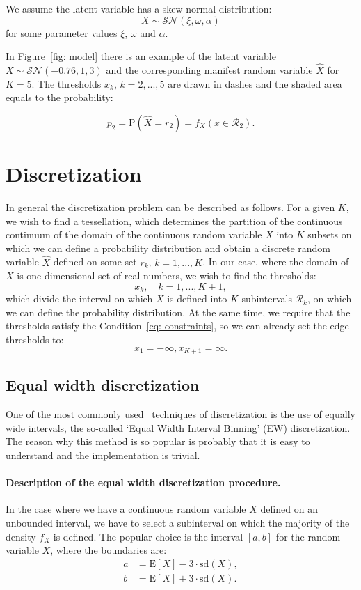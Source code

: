 \documentclass[10pt]{article}
\begin{document}
We assume the latent variable has a skew-normal distribution:
\begin{equation}
X \sim \mathcal{SN}(\xi, \omega, \alpha)
\end{equation}
for some parameter values $\xi$, $\omega$ and $\alpha$.

In Figure~\ref{fig: model} there is an example of the latent variable $X \sim \mathcal{SN}(-0.76, 1, 3)$ and the corresponding manifest random variable $\hat{X}$ for $K = 5$. The thresholds $x_{k}$, $k = 2, ..., 5$ are drawn in dashes and the shaded area equals to the probability:

$$
p_{2} = \mathrm{P}(\hat{X} = r_{2}) = f_{X}(x \in \mathcal{R}_{2}).
$$

\section{Discretization} \label{sec: discretization}
In general the discretization problem can be described as follows. For a given $K$, we wish to find a tessellation, which determines the partition of the continuous continuum of the domain of the continuous random variable $X$ into $K$ subsets on which we can define a probability distribution and obtain a discrete random variable $\hat{X}$ defined on some set $r_{k}$, $k = 1, ..., K$. In our case, where the domain of $X$ is one-dimensional set of real numbers, we wish to find the thresholds:
$$
x_{k}, \quad k = 1, ..., K + 1,
$$
which divide the interval on which $X$ is defined into $K$ subintervals $\mathcal{R}_{k}$, on which we can define the probability distribution. At the same time, we require that the thresholds satisfy the Condition~\ref{eq: constraints}, so we can already set the edge thresholds to:
$$
x_{1} = -\infty, x_{K + 1} = \infty.
$$

\subsection{Equal width discretization} \label{sec: EW}
One of the most commonly used~\cite{Wu} techniques of discretization is the use of equally wide intervals, the so-called ‘Equal Width Interval Binning’ (EW) discretization. The reason why this method is so popular is probably that it is easy to understand and the implementation is trivial.

\paragraph{Description of the equal width discretization procedure.} In the case where we have a continuous random variable $X$ defined on an unbounded interval, we have to select a subinterval on which the majority of the density $f_{X}$ is defined. The popular choice is the interval $[a, b]$ for the random variable $X$, where the boundaries are: 
\begin{align*}
a &= \mathrm{E}[X] - 3 \cdot \mathrm{sd}(X), \\
b &= \mathrm{E}[X] + 3 \cdot \mathrm{sd}(X).
\end{align*}
\end{document}
